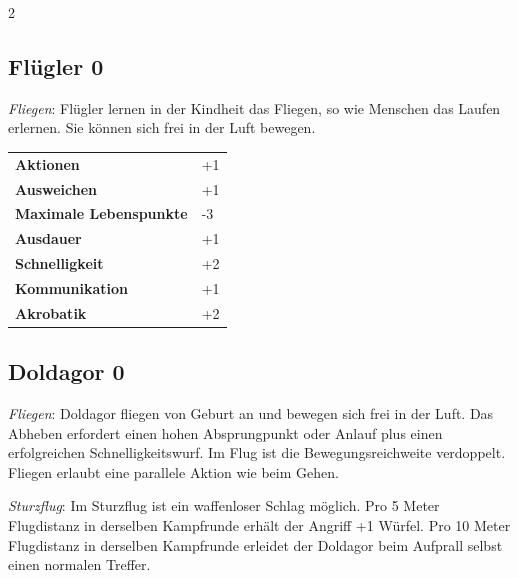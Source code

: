 \begin{multicols}{2}
\begin{tcolorbox}

\end{tcolorbox}

\begin{tcolorbox}
    \subsection*{Flügler \hfill \small{0 }}
    \tcblower
\textit{Fliegen}: Flügler lernen in der Kindheit das Fliegen, so wie Menschen das Laufen erlernen. Sie können sich frei in der Luft bewegen.


\vspace{3mm}

\begin{tabular}{@{}ll@{}}
    \textbf{Aktionen} & +1\\
    \textbf{Ausweichen} & +1\\
    \textbf{Maximale Lebenspunkte} & -3\\
    \textbf{Ausdauer} & +1\\
    \textbf{Schnelligkeit} & +2\\
    \textbf{Kommunikation} & +1\\
    \textbf{Akrobatik} & +2\\
\end{tabular}


\end{tcolorbox}

\begin{tcolorbox}
    \subsection*{Doldagor \hfill \small{0 }}
    \tcblower
\textit{Fliegen}: Doldagor fliegen von Geburt an und bewegen sich frei in der Luft. Das Abheben erfordert einen hohen Absprungpunkt oder Anlauf plus einen erfolgreichen Schnelligkeitswurf. Im Flug ist die Bewegungsreichweite verdoppelt. Fliegen erlaubt eine parallele Aktion wie beim Gehen.

\textit{Sturzflug}: Im Sturzflug ist ein waffenloser Schlag möglich. Pro 5 Meter Flugdistanz in derselben Kampfrunde erhält der Angriff +1 Würfel. Pro 10 Meter Flugdistanz in derselben Kampfrunde erleidet der Doldagor beim Aufprall selbst einen normalen Treffer.



\end{tcolorbox}
\end{multicols}
